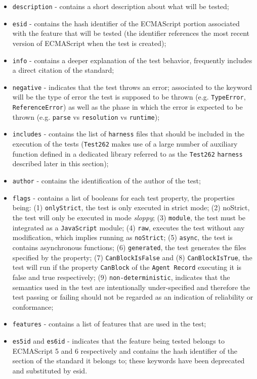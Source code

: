\documentclass[runningheads]{llncs}
\begin{document}
\begin{itemize}
\item \texttt{description} - contains a short description about what will be tested;
%
\item \texttt{esid} - contains the hash identifier of the ECMAScript portion associated with the feature that will be tested (the identifier references the most recent version of ECMAScript when the test is created);
%
\item \texttt{info} - contains a deeper explanation of the test behavior, frequently includes a direct citation of the standard;
%
\item \texttt{negative} - indicates that the test throws an error; associated to the keyword will be the type of error the test is supposed to be thrown (e.g. \texttt{TypeError}, \texttt{ReferenceError}) as well as the phase in which the error is expected to be thrown (e.g. \texttt{parse} vs \texttt{resolution} vs \texttt{runtime});
%
\item \texttt{includes} - contains the list of \texttt{harness} files that should be included in the execution of the tests (\texttt{Test262} makes use of a large number of auxiliary function defined in a dedicated library referred to as the \texttt{Test262} \texttt{harness} described later in this section);
%
\item \texttt{author} - contains the identification of the author of the test;
%
\item \texttt{flags} - contains a list of booleans for each test property, the properties being: (1) \texttt{onlyStrict}, the test is only executed in strict mode; (2) noStrict, the test will only be executed in mode \emph{sloppy}; (3) \texttt{module}, the test must be integrated as a \texttt{JavaScript} module; (4) \texttt{raw}, executes the test without any modification, which implies running as \texttt{noStrict}; (5) \texttt{async}, the test is contains asynchronous functions; (6) \texttt{generated}, the test generates the files specified by the property; (7) \texttt{CanBlockIsFalse} and (8) \texttt{CanBlockIsTrue}, the test will run if the property \texttt{CanBlock} of the \texttt{Agent Record} executing it is false and true respectively; (9) \texttt{non-deterministic}, indicates that the semantics used in the test are intentionally under-specified and therefore the test passing or failing should not be regarded as an indication of reliability or conformance;
%
%
\item \texttt{features} - contains a list of features that are used in the test;
%
\item \texttt{es5id} and \texttt{es6id} - indicates that the feature being tested belongs to ECMAScript 5 and 6 respectively and contains the hash identifier of the section of the standard it belongs to; these keywords have been deprecated and substituted by esid.
\end{itemize}
\end{document}
